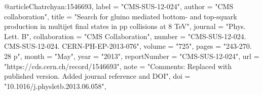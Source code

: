 @article{Chatrchyan:1546693,
      label          = "CMS-SUS-12-024",
      author        = "{CMS collaboration}",
      title         = "{Search for gluino mediated bottom- and top-squark
                       production in multijet final states in pp collisions at 8
                       TeV}",
      journal       = "Phys. Lett. B",
      collaboration = "CMS Collaboration",
      number        = "CMS-SUS-12-024. CMS-SUS-12-024. CERN-PH-EP-2013-076",
      volume        = "725",
      pages         = "243-270. 28 p",
      month         = "May",
      year          = "2013",
      reportNumber  = "CMS-SUS-12-024",
      url           = "https://cds.cern.ch/record/1546693",
      note          = "Comments: Replaced with published version. Added journal
                       reference and DOI",
      doi           = "10.1016/j.physletb.2013.06.058",
}

